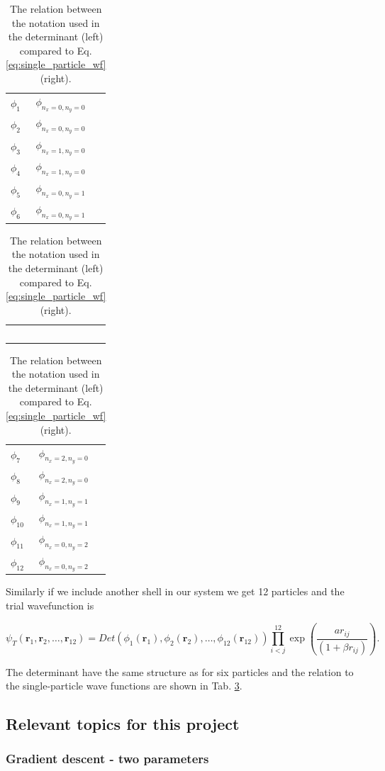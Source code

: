 \begin{table}[H]\caption{The relation between the notation used in the determinant (left) compared to Eq. \ref{eq:single_particle_wf} (right). }\label{tab:notation_wavefunctions}
\large
\center
\begin{tabular}{l|l} 
$\phi_{1}$ & $\phi_{n_x=0, n_y=0}$\\
$\phi_{2}$ & $\phi_{n_x=0, n_y=0}$\\
$\phi_{3}$ & $\phi_{n_x=1, n_y=0}$\\
$\phi_{4}$ & $\phi_{n_x=1, n_y=0}$\\
$\phi_{5}$ & $\phi_{n_x=0, n_y=1}$\\
$\phi_{6}$ & $\phi_{n_x=0, n_y=1}$\\
\end{tabular}
\begin{tabular}{c}
$\,$
\end{tabular}
\begin{tabular}{l|l} 
$\phi_{7}$ & $\phi_{n_x=2, n_y=0}$\\
$\phi_{8}$ & $\phi_{n_x=2, n_y=0}$\\
$\phi_{9}$ & $\phi_{n_x=1, n_y=1}$\\
$\phi_{10}$ & $\phi_{n_x=1, n_y=1}$\\
$\phi_{11}$ & $\phi_{n_x=0, n_y=2}$\\
$\phi_{12}$ & $\phi_{n_x=0, n_y=2}$\\
\end{tabular}
\end{table}

Similarly if we include another shell in our system we get 12 particles and the trial wavefunction is 

\begin{equation}
   \psi_{T}(\bm{r}_1,\bm{r}_2, \dots,\bm{r}_{12}) = 
   Det\left(\phi_{1}(\bm{r}_1),\phi_{2}(\bm{r}_2),
   \dots,\phi_{12}(\bm{r}_{12})\right)
   \prod_{i<j}^{12}\exp{\left(\frac{ar_{ij}}{(1+\beta r_{ij})}\right)}.
\end{equation}

The determinant have the same structure as for six particles and the relation to the single-particle wave functions are shown in Tab. \ref{tab:notation_wavefunctions}.

\subsection{Relevant topics for this project}

\subsubsection{Gradient descent - two parameters}

